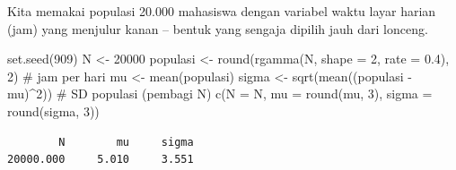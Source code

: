 \documentclass[
  indonesian,
  letterpaper,
]{book}
\newenvironment{Shaded}{\begin{snugshade}}{\end{snugshade}}
\newcommand{\AttributeTok}[1]{\textcolor[rgb]{0.40,0.45,0.13}{#1}}
\newcommand{\CommentTok}[1]{\textcolor[rgb]{0.37,0.37,0.37}{#1}}
\newcommand{\DecValTok}[1]{\textcolor[rgb]{0.68,0.00,0.00}{#1}}
\newcommand{\FloatTok}[1]{\textcolor[rgb]{0.68,0.00,0.00}{#1}}
\newcommand{\FunctionTok}[1]{\textcolor[rgb]{0.28,0.35,0.67}{#1}}
\newcommand{\NormalTok}[1]{\textcolor[rgb]{0.00,0.23,0.31}{#1}}
\newcommand{\OtherTok}[1]{\textcolor[rgb]{0.00,0.23,0.31}{#1}}
\newcommand{\SpecialCharTok}[1]{\textcolor[rgb]{0.37,0.37,0.37}{#1}}
\begin{document}
Kita memakai populasi 20.000 mahasiswa dengan variabel waktu layar
harian (jam) yang menjulur kanan -- bentuk yang sengaja dipilih jauh
dari lonceng.

\begin{Shaded}
\begin{Highlighting}[]
\FunctionTok{set.seed}\NormalTok{(}\DecValTok{909}\NormalTok{)}
\NormalTok{N }\OtherTok{\textless{}{-}} \DecValTok{20000}
\NormalTok{populasi }\OtherTok{\textless{}{-}} \FunctionTok{round}\NormalTok{(}\FunctionTok{rgamma}\NormalTok{(N, }\AttributeTok{shape =} \DecValTok{2}\NormalTok{, }\AttributeTok{rate =} \FloatTok{0.4}\NormalTok{), }\DecValTok{2}\NormalTok{) }\CommentTok{\# jam per hari}
\NormalTok{mu }\OtherTok{\textless{}{-}} \FunctionTok{mean}\NormalTok{(populasi)}
\NormalTok{sigma }\OtherTok{\textless{}{-}} \FunctionTok{sqrt}\NormalTok{(}\FunctionTok{mean}\NormalTok{((populasi }\SpecialCharTok{{-}}\NormalTok{ mu)}\SpecialCharTok{\^{}}\DecValTok{2}\NormalTok{)) }\CommentTok{\# SD populasi (pembagi N)}
\FunctionTok{c}\NormalTok{(}\AttributeTok{N =}\NormalTok{ N, }\AttributeTok{mu =} \FunctionTok{round}\NormalTok{(mu, }\DecValTok{3}\NormalTok{), }\AttributeTok{sigma =} \FunctionTok{round}\NormalTok{(sigma, }\DecValTok{3}\NormalTok{))}
\end{Highlighting}
\end{Shaded}

\begin{verbatim}
        N        mu     sigma 
20000.000     5.010     3.551 
\end{verbatim}
\end{document}
